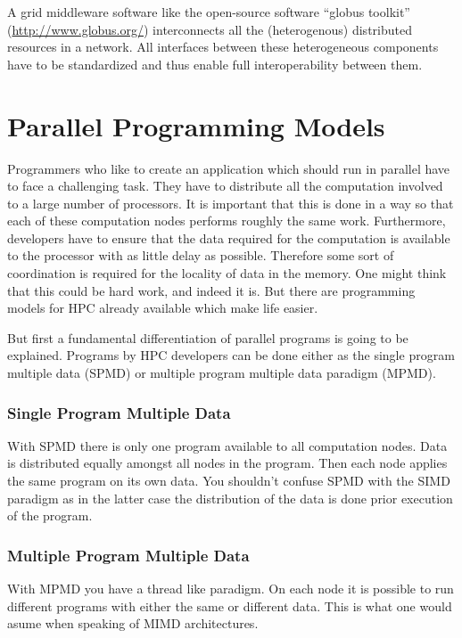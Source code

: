 A grid middleware software like the open-source software ``globus
toolkit'' (\url{http://www.globus.org/}) interconnects all the (heterogenous)
distributed resources in a network.  
All interfaces between these heterogeneous components have to be standardized
and thus enable full interoperability between them.

\section{Parallel Programming Models}
\label{sec:programming_models}

Programmers who like to create an application which should run in
parallel have to face a challenging task. They have to distribute all
the computation involved to a large number of processors. It is
important that this is done in a way so that each of these computation
nodes performs roughly the same work. Furthermore, developers have to
ensure that the data required for the computation is available to the
processor with as little delay as possible. Therefore some sort of
coordination is required for the locality of data in the memory.
One might think that this could be hard work, and indeed it is. But
there are programming models for HPC already available which make life
easier.

But first a fundamental differentiation of parallel programs is going
to be explained. Programs by HPC developers can be done either
as the single program multiple data (SPMD) or multiple program
multiple data paradigm (MPMD).

\subsubsection{Single Program Multiple Data}

With SPMD there is only one program available
to all computation nodes. Data is distributed equally amongst all
nodes in the program. Then each node applies the same program on its
own data. You shouldn't confuse SPMD with the SIMD paradigm as in the
latter case the
distribution of the data is done prior execution of the program.

\subsubsection{Multiple Program Multiple Data}

With MPMD you have a thread like paradigm. On each node it is possible
to run different programs with either the same or different data. This
is what one would asume when speaking of MIMD architectures.  


